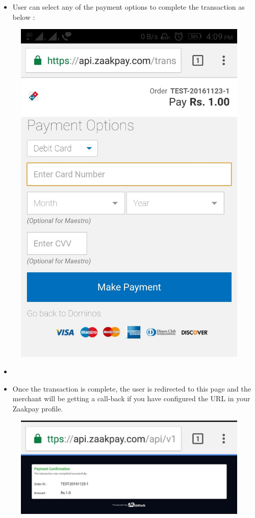 \documentclass{article}
\begin{document}
\begin{itemize}
\item User can select any of the payment options to complete the transaction as below :
\end{itemize}
\begin{figure}[H]
\centering
\includegraphics[scale=0.16]{Screenshot_2016-11-23-16-09-36-673.jpg}
\end{figure}
\begin{itemize}
\item 
\item Once the transaction is complete, the user is redirected to this page and the merchant will be getting a call-back if you have configured the URL in your Zaakpay profile.
\end{itemize}
\begin{figure}[H]
\centering
\includegraphics[width=17cm]{Screenshot_2016-11-23-16-10-28-991.jpg}
\end{figure}
\newpage
\end{document}
